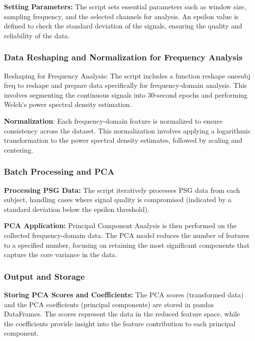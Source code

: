 \documentclass[12pt, a4paper,oneside]{book}
\numberwithin{equation}{section}
\begin{document}
\textbf{Setting Parameters:} The script sets essential parameters such as window size, sampling frequency, and the selected channels for analysis. An epsilon value is defined to check the standard deviation of the signals, ensuring the quality and reliability of the data.

\subsubsection{Data Reshaping and Normalization for Frequency Analysis}
Reshaping for Frequency Analysis: The script includes a function reshape onesubj freq to reshape and prepare data specifically for frequency-domain analysis. This involves segmenting the continuous signals into 30-second epochs and performing Welch's power spectral density estimation.

\textbf{Normalization}: Each frequency-domain feature is normalized to ensure consistency across the dataset. This normalization involves applying a logarithmic transformation to the power spectral density estimates, followed by scaling and centering.

\subsubsection{Batch Processing and PCA}
\textbf{Processing PSG Data:} The script iteratively processes PSG data from each subject, handling cases where signal quality is compromised (indicated by a standard deviation below the epsilon threshold).

\textbf{PCA Application:} Principal Component Analysis is then performed on the collected frequency-domain data. The PCA model reduces the number of features to a specified number, focusing on retaining the most significant components that capture the core variance in the data.

\subsubsection{Output and Storage}
\textbf{Storing PCA Scores and Coefficients:} The PCA scores (transformed data) and the PCA coefficients (principal components) are stored in pandas DataFrames. The scores represent the data in the reduced feature space, while the coefficients provide insight into the feature contribution to each principal component.
\end{document}
